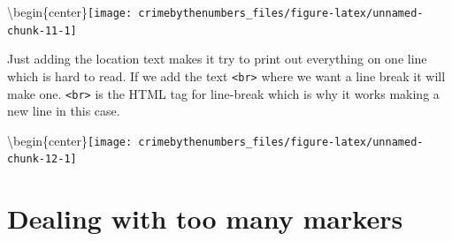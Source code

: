 \documentclass[
]{krantz}
\makeatletter
\newenvironment{Shaded}{\begin{snugshade}}{\end{snugshade}}
\newcommand{\AttributeTok}[1]{\textcolor[rgb]{0.61,0.61,0.61}{#1}}
\newcommand{\DecValTok}[1]{\textcolor[rgb]{0.06,0.06,0.06}{#1}}
\newcommand{\FunctionTok}[1]{\textcolor[rgb]{0,0,0}{#1}}
\newcommand{\NormalTok}[1]{#1}
\newcommand{\SpecialCharTok}[1]{\textcolor[rgb]{0,0,0}{#1}}
\newcommand{\StringTok}[1]{\textcolor[rgb]{0.5,0.5,0.5}{#1}}
\newenvironment{kframe}{%
\medskip{}
\setlength{\fboxsep}{.8em}
 \def\at@end@of@kframe{}%
 \ifinner\ifhmode%
  \def\at@end@of@kframe{\end{minipage}}%
  \begin{minipage}{\columnwidth}%
 \fi\fi%
 \def\FrameCommand##1{\hskip\@totalleftmargin \hskip-\fboxsep
 \colorbox{shadecolor}{##1}\hskip-\fboxsep
     \hskip-\linewidth \hskip-\@totalleftmargin \hskip\columnwidth}%
 \MakeFramed {\advance\hsize-\width
   \@totalleftmargin\z@ \linewidth\hsize
   \@setminipage}}%
 {\par\unskip\endMakeFramed%
 \at@end@of@kframe}
\renewenvironment{Shaded}{\begin{kframe}}{\end{kframe}}
\makeatother
\begin{document}
\textbackslash begin\{center\}\texttt{[image: crimebythenumbers\_files/figure-latex/unnamed-chunk-11-1]}

Just adding the location text makes it try to print out everything on one line which is hard to read. If we add the text \texttt{\textless{}br\textgreater{}} where we want a line break it will make one. \texttt{\textless{}br\textgreater{}} is the HTML tag for line-break which is why it works making a new line in this case.

\begin{Shaded}
\end{Shaded}

\textbackslash begin\{center\}\texttt{[image: crimebythenumbers\_files/figure-latex/unnamed-chunk-12-1]}

\hypertarget{dealing-with-too-many-markers}{%
\section{Dealing with too many markers}\label{dealing-with-too-many-markers}}
\end{document}
